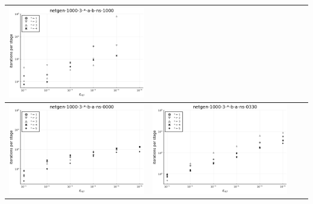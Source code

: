 \documentclass{article}
\begin{document}
\begin{landscape}
\begin{center}
\begin{longtable}{| c | c | c | c |}
\includegraphics[height=0.22\textheight]{itepst_fixlim_netgen-1000-3-_-a-b-ns-1000.png} \\
                \hline
\includegraphics[height=0.22\textheight]{itepst_fixlim_netgen-1000-3-_-b-a-ns-0000.png} &
\includegraphics[height=0.22\textheight]{itepst_fixlim_netgen-1000-3-_-b-a-ns-0330.png} &

\end{longtable}
\end{center}
\end{landscape}
\end{document}
